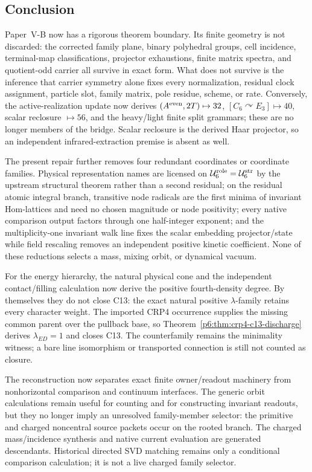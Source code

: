 \documentclass[12pt,a4paper]{article}
\newcommand{\Ubase}{\mathcal U_6^{\rm str}}
\newcommand{\Urole}{\mathcal U_6^{\rm role}}
\begin{document}
\subsection{Conclusion}
\label{p6:sec:conclusion}

Paper~V-B now has a rigorous theorem boundary.  Its finite geometry is not
discarded: the corrected family plane, binary polyhedral groups, cell
incidence, terminal-map classifications, projector exhaustions, finite
matrix spectra, and quotient-odd carrier all survive in exact form.  What
does not survive is the inference that carrier symmetry alone fixes every
normalization, residual clock assignment, particle slot, family matrix, pole
residue, scheme, or rate.  Conversely, the active-realization update now
derives \((A^{\rm even},2T)\mapsto32\),
\([C_6\curvearrowright E_3]\mapsto40\), scalar reclosure
\(\mapsto56\), and the heavy/light finite split grammars; these are no longer
members of the bridge.  Scalar reclosure is the derived Haar projector, so an
independent infrared-extraction premise is absent as well.

The present repair further removes four redundant coordinates or coordinate
families.  Physical
representation names are licensed on \(\Urole=\Ubase\) by the upstream
structural theorem rather than a second residual; on the residual atomic integral branch,
transitive node radicals are the first minima of invariant Hom-lattices and
need no chosen magnitude or node positivity; every native comparison output
factors through one half-integer exponent; and the multiplicity-one invariant
walk line fixes the scalar embedding projector/state while field rescaling
removes an independent positive kinetic coefficient.  None of these
reductions selects a mass, mixing orbit, or dynamical vacuum.

For the energy hierarchy, the natural physical cone and the independent
contact/filling calculation now derive the positive fourth-density degree.
By themselves they do not close C13: the exact natural positive
$\lambda$-family retains every character weight.  The imported CRP4
occurrence supplies the missing common parent over the pullback base, so
Theorem~\ref{p6:thm:crp4-c13-discharge} derives \(\lambda_{ED}=1\) and closes
C13.  The counterfamily remains the minimality witness; a bare line
isomorphism or transported connection is still not counted as closure.

The reconstruction now separates exact finite owner/readout machinery from
nonhorizontal comparison and continuum interfaces.  The generic orbit
calculations remain useful for counting and for constructing invariant
readouts, but they no longer imply an unresolved family-member selector: the
primitive and charged noncentral source packets occur on the rooted branch.
The charged mass/incidence synthesis and native current evaluation are
generated descendants. Historical directed SVD matching remains only a
conditional comparison calculation; it is not a live charged family selector.
\end{document}
